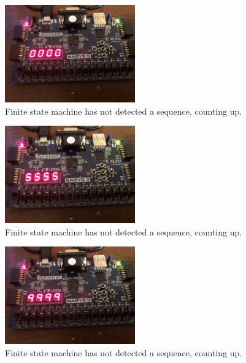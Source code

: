 \documentclass[11pt]{article}
\begin{document}
\begin{figure}[H]
\begin{center}
	\includegraphics[width=0.5\textwidth]{./images/p3/IMG_1014.jpg}
	\caption{\label{fig:int_res1}Finite state machine has not detected a sequence, counting up.}
\end{center}
\end{figure}

\begin{figure}[H]
\begin{center}
	\includegraphics[width=0.5\textwidth]{./images/p3/IMG_1015.jpg}
	\caption{\label{fig:int_res2}Finite state machine has not detected a sequence, counting up.}
\end{center}
\end{figure}

\begin{figure}[H]
\begin{center}
	\includegraphics[width=0.5\textwidth]{./images/p3/IMG_1016.jpg}
	\caption{\label{fig:int_res3}Finite state machine has not detected a sequence, counting up.}
\end{center}
\end{figure}
\end{document}
